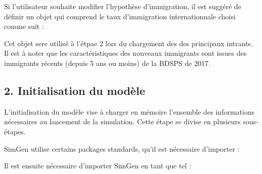 \documentclass[letterpaper,10pt,french]{sphinxmanual}
\begin{document}
Si l’utilisateur souhaite modifier l’hypothèse d’immigration, il est suggéré de définir un objet qui comprend le taux d’immigration internationnale choisi comme suit :

\begin{sphinxVerbatim}[commandchars=\\\{\}]
  
\end{sphinxVerbatim}

Cet objet sere utilisé à l’étpae 2 lors du chargement des des principaux intrants.
Il est à noter que les caractéristiques des nouveaux immigrants sont issues des immigrants récents (depuis 5 ans ou moins) de la BDSPS de 2017.


\subsection{2. Initialisation du modèle}
\label{\detokenize{utilisation:initialisation-du-modele}}
L’initialisation du modèle vise à charger en mémoire l’ensemble des informations nécessaires au lancement de la simulation.
Cette étape se divise en plusieurs sous-étapes.


SimGen utilise certains packages standards, qu’il est nécessaire d’importer :

\begin{sphinxVerbatim}[commandchars=\\\{\}]
 
   
   
     
\end{sphinxVerbatim}


Il est ensuite nécessaire d’importer SimGen en tant que tel :

\begin{sphinxVerbatim}[commandchars=\\\{\}]
 
    
\end{sphinxVerbatim}
\end{document}
